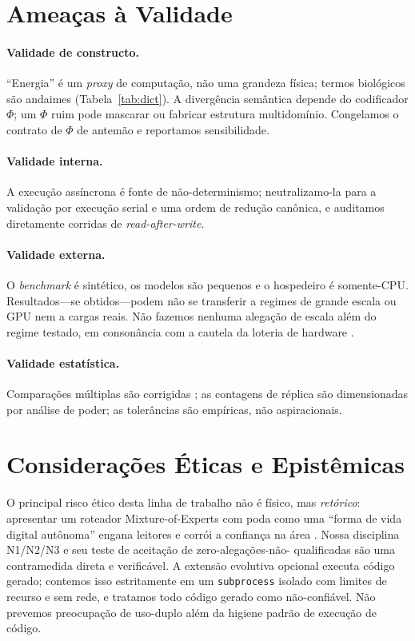 \documentclass[11pt]{article}
\begin{document}
\section{Ameaças à Validade}
\paragraph{Validade de constructo.}
``Energia'' é um \emph{proxy} de computação, não uma grandeza física; termos
biológicos são andaimes (Tabela~\ref{tab:dict}). A divergência semântica depende do
codificador $\Phi$; um $\Phi$ ruim pode mascarar ou fabricar estrutura
multidomínio. Congelamos o contrato de $\Phi$ de antemão e reportamos
sensibilidade.

\paragraph{Validade interna.}
A execução assíncrona é fonte de não-determinismo; neutralizamo-la para a validação
por execução serial e uma ordem de redução canônica, e auditamos diretamente
corridas de \emph{read-after-write}.

\paragraph{Validade externa.}
O \emph{benchmark} é sintético, os modelos são pequenos e o hospedeiro é
somente-CPU. Resultados---se obtidos---podem não se transferir a regimes de grande
escala ou GPU nem a cargas reais. Não fazemos nenhuma alegação de escala além do
regime testado, em consonância com a cautela da loteria de hardware
\cite{hooker2021hardware}.

\paragraph{Validade estatística.}
Comparações múltiplas são corrigidas \cite{holm1979bonferroni}; as contagens de
réplica são dimensionadas por análise de poder; as tolerâncias são empíricas, não
aspiracionais.

\section{Considerações Éticas e Epistêmicas}
O principal risco ético desta linha de trabalho não é físico, mas \emph{retórico}:
apresentar um roteador Mixture-of-Experts com poda como uma ``forma de vida digital
autônoma'' engana leitores e corrói a confiança na área \cite{lipton2019troubling}.
Nossa disciplina N1/N2/N3 e seu teste de aceitação de zero-alegações-não-%
qualificadas são uma contramedida direta e verificável. A extensão evolutiva
opcional executa código gerado; contemos isso estritamente em um \texttt{subprocess}
isolado com limites de recurso e sem rede, e tratamos todo código gerado como
não-confiável. Não prevemos preocupação de uso-duplo além da higiene padrão de
execução de código.
\end{document}
